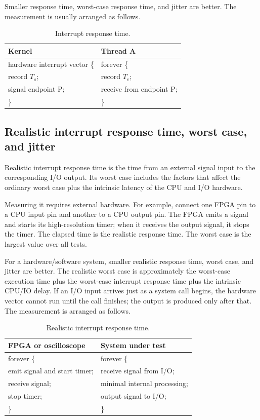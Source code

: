 Smaller response time, worst-case response time, and jitter are better.
The measurement is usually arranged as follows.

\begin{table}[htbp]
    \centering
    \caption{Interrupt response time.}
    \small
    \begin{tabular}{@{}p{}p{}@{}}
        \toprule
        Kernel & Thread A\\
        \midrule
        hardware interrupt vector \{ & forever \{ \\ \quad record \(T_s\); & \quad record \(T_e\); \\ \quad signal endpoint P; & \quad receive from endpoint P; \\ \} & \}\\
        \bottomrule
    \end{tabular}
\end{table}

\subsection{Realistic interrupt response time, worst case, and jitter}

Realistic interrupt response time is the time from an external signal input to the corresponding I/O output.
Its worst case includes the factors that affect the ordinary worst case plus the intrinsic latency of the CPU and I/O hardware.

Measuring it requires external hardware.
For example, connect one FPGA pin to a CPU input pin and another to a CPU output pin.
The FPGA emits a signal and starts its high-resolution timer; when it receives the output signal, it stops the timer.
The elapsed time is the realistic response time.
The worst case is the largest value over all tests.

For a hardware/software system, smaller realistic response time, worst case, and jitter are better.
The realistic worst case is approximately the worst-case execution time plus the worst-case interrupt response time plus the intrinsic CPU/IO delay.
If an I/O input arrives just as a system call begins, the hardware vector cannot run until the call finishes; the output is produced only after that.
The measurement is arranged as follows.

\begin{table}[htbp]
    \centering
    \caption{Realistic interrupt response time.}
    \small
    \begin{tabular}{@{}p{}p{}@{}}
        \toprule
        FPGA or oscilloscope & System under test\\
        \midrule
        forever \{ & forever \{ \\ \quad emit signal and start timer; & \quad receive signal from I/O; \\ \quad receive signal; & \quad minimal internal processing; \\ \quad stop timer; & \quad output signal to I/O; \\ \} & \}\\
        \bottomrule
    \end{tabular}
\end{table}

